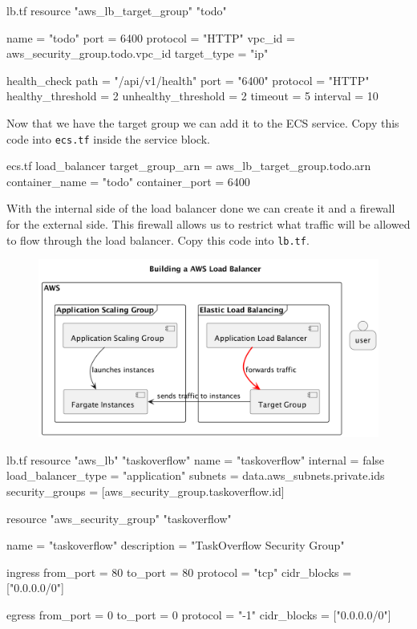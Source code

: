 \documentclass{csse4400}
\begin{document}
\begin{code}[language=terraform,numbers=none]{lb.tf}
resource "aws_lb_target_group" "todo" {
  name     = "todo"
  port     = 6400
  protocol = "HTTP"
  vpc_id   = aws_security_group.todo.vpc_id
  target_type = "ip"

  health_check {
    path = "/api/v1/health"
    port = "6400"
    protocol = "HTTP"
    healthy_threshold = 2
    unhealthy_threshold = 2
    timeout = 5
    interval = 10
  }
}
\end{code}

Now that we have the target group we can add it to the ECS service. Copy this code into \texttt{ecs.tf} inside the service block.

\begin{code}[language=terraform,numbers=none]{ecs.tf}
  load_balancer {
    target_group_arn = aws_lb_target_group.todo.arn
    container_name   = "todo"
    container_port   = 6400
  }
\end{code}

With the internal side of the load balancer done we can create it and a firewall for the external side. This firewall allows us to restrict what traffic will be allowed to flow through the load balancer. Copy this code into \texttt{lb.tf}.

\begin{figure}[H]
  \begin{center}
    \includegraphics[scale=0.2]{diagrams/lb3fargate}
  \end{center}
\end{figure}

\begin{code}[language=terraform,numbers=none]{lb.tf}
resource "aws_lb" "taskoverflow" {
  name               = "taskoverflow"
  internal           = false
  load_balancer_type = "application"
  subnets            = data.aws_subnets.private.ids
  security_groups    = [aws_security_group.taskoverflow.id]
}

resource "aws_security_group" "taskoverflow" {
  name = "taskoverflow"
  description = "TaskOverflow Security Group"

  ingress {
    from_port = 80
    to_port = 80
    protocol = "tcp"
    cidr_blocks = ["0.0.0.0/0"]
  }

  egress {
    from_port = 0
    to_port = 0
    protocol = "-1"
    cidr_blocks = ["0.0.0.0/0"]
  }
}
\end{code}
\end{document}
